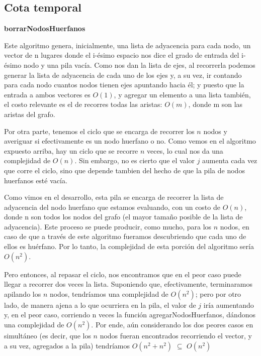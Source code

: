 \subsection{Cota temporal}
\begin{center}
\textbf{borrarNodosHuerfanos}
\end{center}
\par
Este algoritmo genera, inicialmente, una lista de adyacencia para cada nodo, un vector de n lugares donde el i-ésimo espacio nos dice el grado de entrada del i-ésimo nodo y una pila vacía. Como nos dan la lista de ejes, al recorrerla podemos generar la lista de adyacencia de cada uno de los ejes y, a su vez, ir contando para cada nodo cuantos nodos tienen ejes apuntando hacia él; y puesto que la entrada a ambos vectores es $O(1)$, y agregar un elemento a una lista también, el costo relevante es el de recorres todas las aristas: $O(m)$, donde m son las aristas del grafo.
\\
\par
Por otra parte, tenemos el ciclo que se encarga de recorrer los $n$ nodos y averiguar si efectivamente es un nodo huerfano o no. Como vemos en el algoritmo expuesto arriba, hay un ciclo que se recorre $n$ veces, lo cual nos da una complejidad de $O(n)$. Sin embargo, no es cierto que el valor $j$ aumenta cada vez que corre el ciclo, sino que depende tambien del hecho de que la pila de nodos huerfanos esté vacía.
\\
\par
Como vimos en el desarrollo, esta pila se encarga de recorrer la lista de adyacencia del nodo huerfano que estamos evaluando, con un costo de $O(n)$, donde n son todos los nodos del grafo (el mayor tamaño posible de la lista de adyacencia). Este proceso se puede producir, como mucho, para los $n$ nodos, en caso de que a través de este algoritmo fueramos descubriendo que cada uno de ellos es huérfano. Por lo tanto, la complejidad de esta porción del algoritmo sería $O(n^2)$.
\\
\par
Pero entonces, al repasar el ciclo, nos encontramos que en el peor caso puede llegar a recorrer dos veces la lista. Suponiendo que, efectivamente, terminaramos apilando los $n$ nodos, tendríamos una complejidad de $O(n^2)$; pero por otro lado, de manera ajena a lo que ocurriera en la pila, el valor de $j$ iría aumentando y, en el peor caso, corriendo n veces la función agregarNodosHuerfanos, dándonos una complejidad de $O(n^2)$. Por ende, aún considerando los dos peores casos en simultáneo (es decir, que los $n$ nodos fueran encontrados recorriendo el vector, y a su vez, agregados a la pila) tendríamos $O(n^2 + n^2)$ $\subseteq$ $O(n^2)$

